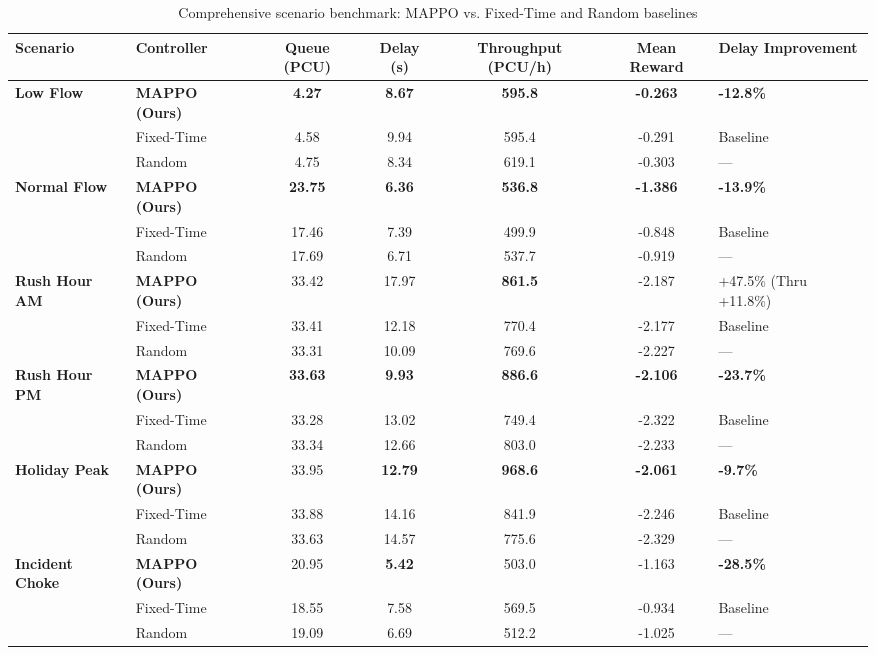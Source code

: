 \begin{table}[htbp]
\centering
\scriptsize
\setlength{\tabcolsep}{3pt}
\caption{Comprehensive scenario benchmark: MAPPO vs. Fixed-Time and Random baselines}
\label{tab:ch5_eval_summary}
\begin{tabularx}{\textwidth}{|p{2.2cm}|p{2.2cm}|c|c|c|c|X|}
\hline
\textbf{Scenario} & \textbf{Controller} & \textbf{Queue (PCU)} & \textbf{Delay (s)} & \textbf{Throughput (PCU/h)} & \textbf{Mean Reward} & \textbf{Delay Improvement} \\ \hline
\multirow{3}{*}{\textbf{Low Flow}} & \textbf{MAPPO (Ours)} & \textbf{4.27} & \textbf{8.67} & \textbf{595.8} & \textbf{-0.263} & \textbf{-12.8\%} \\
& Fixed-Time & 4.58 & 9.94 & 595.4 & -0.291 & Baseline \\
& Random & 4.75 & 8.34 & 619.1 & -0.303 & --- \\ \hline
\multirow{3}{*}{\textbf{Normal Flow}} & \textbf{MAPPO (Ours)} & \textbf{23.75} & \textbf{6.36} & \textbf{536.8} & \textbf{-1.386} & \textbf{-13.9\%} \\
& Fixed-Time & 17.46 & 7.39 & 499.9 & -0.848 & Baseline \\
& Random & 17.69 & 6.71 & 537.7 & -0.919 & --- \\ \hline
\multirow{3}{*}{\textbf{Rush Hour AM}} & \textbf{MAPPO (Ours)} & 33.42 & 17.97 & \textbf{861.5} & -2.187 & +47.5\% (Thru +11.8\%) \\
& Fixed-Time & 33.41 & 12.18 & 770.4 & -2.177 & Baseline \\
& Random & 33.31 & 10.09 & 769.6 & -2.227 & --- \\ \hline
\multirow{3}{*}{\textbf{Rush Hour PM}} & \textbf{MAPPO (Ours)} & \textbf{33.63} & \textbf{9.93} & \textbf{886.6} & \textbf{-2.106} & \textbf{-23.7\%} \\
& Fixed-Time & 33.28 & 13.02 & 749.4 & -2.322 & Baseline \\
& Random & 33.34 & 12.66 & 803.0 & -2.233 & --- \\ \hline
\multirow{3}{*}{\textbf{Holiday Peak}} & \textbf{MAPPO (Ours)} & 33.95 & \textbf{12.79} & \textbf{968.6} & \textbf{-2.061} & \textbf{-9.7\%} \\
& Fixed-Time & 33.88 & 14.16 & 841.9 & -2.246 & Baseline \\
& Random & 33.63 & 14.57 & 775.6 & -2.329 & --- \\ \hline
\multirow{3}{*}{\textbf{Incident Choke}} & \textbf{MAPPO (Ours)} & 20.95 & \textbf{5.42} & 503.0 & -1.163 & \textbf{-28.5\%} \\
& Fixed-Time & 18.55 & 7.58 & 569.5 & -0.934 & Baseline \\
& Random & 19.09 & 6.69 & 512.2 & -1.025 & --- \\ \hline
\end{tabularx}
\end{table}

